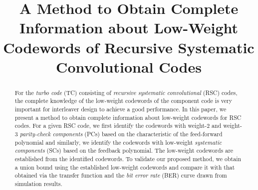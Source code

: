 \documentclass[journal,draftcls,onecolumn,12pt,twoside]{IEEEtran}
\newcommand{\folder}{/home/bohulu/Documents/texmf}
\begin{document}
\title{
A Method to Obtain Complete Information about Low-Weight Codewords of Recursive Systematic Convolutional Codes}
\author{%
}


\maketitle
\begin{abstract}
For the {\it turbo code} (TC) consisting of  {\it recursive systematic convolutional} (RSC) codes, the complete knowledge of the low-weight codewords of the component code is very important for interleaver design to achieve a good performance. In this paper, we present a method to obtain complete information about low-weight codewords for  RSC codes. For a given RSC code, we first identify the codewords with weight-$2$ and weight-$3$ {\it parity-check components} (PCs) based on the characteristic of the feed-forward polynomial and similarly, we identify the codewords with low-weight {\it systematic components} (SCs) based on the feedback polynomial. The low-weight codewords are established from the identified codewords. To validate our proposed method, we obtain a union bound using the established low-weight codewords and compare it with that obtained via the transfer function and the {\it bit error rate} (BER) curve drawn from simulation results.

\end{abstract}








\end{document}
